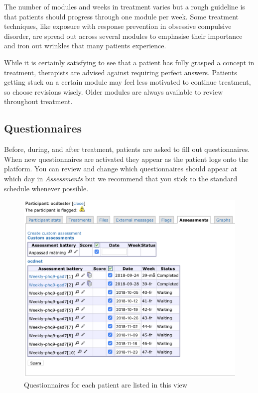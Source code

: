 \documentclass[]{book}
\theoremstyle{definition}
\theoremstyle{definition}
\theoremstyle{definition}
\theoremstyle{remark}
\begin{document}
The number of modules and weeks in treatment varies but a rough
guideline is that patients should progress through one module per week.
Some treatment techniques, like exposure with response prevention in
obsessive compulsive disorder, are spread out across several modules to
emphasise their importance and iron out wrinkles that many patients
experience.

While it is certainly satisfying to see that a patient has fully grasped
a concept in treatment, therapists are advised against requiring perfect
answers. Patients getting stuck on a certain module may feel less
motivated to continue treatment, so choose revisions wisely. Older
modules are always available to review throughout treatment.

\hypertarget{questionnaires}{%
\subsection{Questionnaires}\label{questionnaires}}

Before, during, and after treatment, patients are asked to fill out
questionnaires. When new questionnaires are activated they appear as the
patient logs onto the platform. You can review and change which
questionnaires should appear at which day in \emph{Assessments} but we
recommend that you stick to the standard schedule whenever possible.

\begin{figure}
\centering
\includegraphics{images/assessments-list.png}
\caption{Questionnaires for each patient are listed in this view}
\end{figure}
\end{document}
